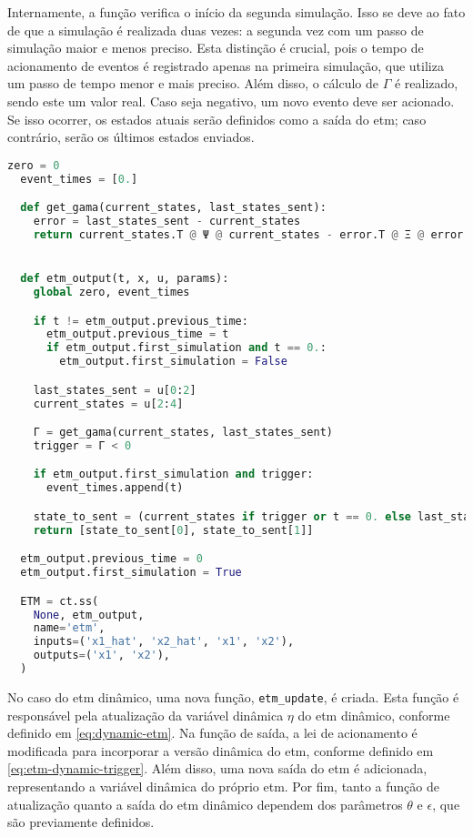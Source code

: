 Internamente, a função verifica o início da segunda simulação. Isso se deve ao fato de que a simulação é realizada duas vezes: a segunda vez com um passo de simulação maior e menos preciso. Esta distinção é crucial, pois o tempo de acionamento de eventos é registrado apenas na primeira simulação, que utiliza um passo de tempo menor e mais preciso. Além disso, o cálculo de $\Gamma$ é realizado, sendo este um valor real. Caso seja negativo, um novo evento deve ser acionado. Se isso ocorrer, os estados atuais serão definidos como a saída do \acrshort{etm}; caso contrário, serão os últimos estados enviados.

\vspace{8pt}
\begin{lstlisting}[language=Python, caption={Implementação do \acrshort{etm} estático.}, label=cod:static_etm]
  zero = 0
  event_times = [0.]

  def get_gama(current_states, last_states_sent):
    error = last_states_sent - current_states
    return current_states.T @ Ψ @ current_states - error.T @ Ξ @ error


  def etm_output(t, x, u, params):
    global zero, event_times

    if t != etm_output.previous_time:
      etm_output.previous_time = t
      if etm_output.first_simulation and t == 0.:
        etm_output.first_simulation = False

    last_states_sent = u[0:2]
    current_states = u[2:4]

    Γ = get_gama(current_states, last_states_sent)
    trigger = Γ < 0

    if etm_output.first_simulation and trigger:
      event_times.append(t)

    state_to_sent = (current_states if trigger or t == 0. else last_states_sent)
    return [state_to_sent[0], state_to_sent[1]]

  etm_output.previous_time = 0
  etm_output.first_simulation = True

  ETM = ct.ss(
    None, etm_output,
    name='etm',
    inputs=('x1_hat', 'x2_hat', 'x1', 'x2'),
    outputs=('x1', 'x2'),
  )
\end{lstlisting}

No caso do \acrshort{etm} dinâmico, uma nova função, \texttt{etm\_update}, é criada. Esta função é responsável pela atualização da variável dinâmica $\eta$ do \acrshort{etm} dinâmico, conforme definido em \eqref{eq:dynamic-etm}. Na função de saída, a lei de acionamento é modificada para incorporar a versão dinâmica do \acrshort{etm}, conforme definido em \eqref{eq:etm-dynamic-trigger}. Além disso, uma nova saída do \acrshort{etm} é adicionada, representando a variável dinâmica do próprio \acrshort{etm}. Por fim, tanto a função de atualização quanto a saída do \acrshort{etm} dinâmico dependem dos parâmetros $\theta$ e $\epsilon$, que são previamente definidos.

